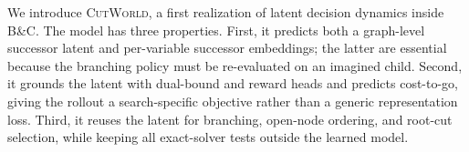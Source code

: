 \documentclass{article}
\newcommand{\CutWorld}{\textsc{CutWorld}}
\newcommand{\BnC}{B\&C}
\begin{document}
We introduce \CutWorld{}, a first realization of latent decision dynamics inside \BnC. The model has three properties. First, it predicts both a graph-level successor latent and per-variable successor embeddings; the latter are essential because the branching policy must be re-evaluated on an imagined child. Second, it grounds the latent with dual-bound and reward heads and predicts cost-to-go, giving the rollout a search-specific objective rather than a generic representation loss. Third, it reuses the latent for branching, open-node ordering, and root-cut selection, while keeping all exact-solver tests outside the learned model.



\end{document}
